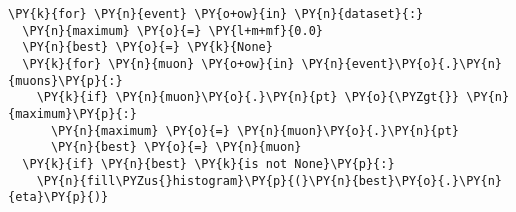 \begin{Verbatim}[commandchars=\\\{\}]
\PY{k}{for} \PY{n}{event} \PY{o+ow}{in} \PY{n}{dataset}{:}
  \PY{n}{maximum} \PY{o}{=} \PY{l+m+mf}{0.0}
  \PY{n}{best} \PY{o}{=} \PY{k}{None}
  \PY{k}{for} \PY{n}{muon} \PY{o+ow}{in} \PY{n}{event}\PY{o}{.}\PY{n}{muons}\PY{p}{:}
    \PY{k}{if} \PY{n}{muon}\PY{o}{.}\PY{n}{pt} \PY{o}{\PYZgt{}} \PY{n}{maximum}\PY{p}{:}
      \PY{n}{maximum} \PY{o}{=} \PY{n}{muon}\PY{o}{.}\PY{n}{pt}
      \PY{n}{best} \PY{o}{=} \PY{n}{muon}
  \PY{k}{if} \PY{n}{best} \PY{k}{is not None}\PY{p}{:}
    \PY{n}{fill\PYZus{}histogram}\PY{p}{(}\PY{n}{best}\PY{o}{.}\PY{n}{eta}\PY{p}{)}
\end{Verbatim}
